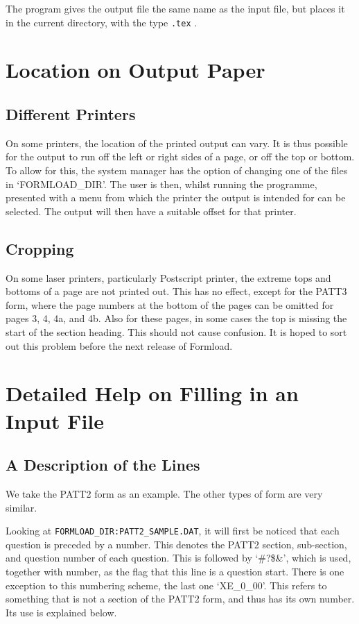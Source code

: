 The program gives the output file the same name as the input file,
but places it in the current directory, with the type {\tt .tex} .

\section{Location on Output Paper}
\label{se:locate}

\subsection{Different Printers} 

On some printers, the location of the printed output can vary. It is thus
possible for the output to run off the left or right sides of a page, or
off the top or bottom. To allow for this, the system manager has the option
of changing one of the files in `FORMLOAD\_DIR'. The user is then, whilst
running the programme, presented with a menu from which the printer the
output is intended for can be selected. The output will then have a
suitable offset for that printer. 


\subsection{Cropping}

On some laser printers, particularly Postscript printer, the extreme tops
and bottoms of a page are not printed out. This has no effect, except for
the PATT3 form, where the page numbers at the bottom of the pages can be
omitted for pages 3, 4, 4a, and 4b. Also for these pages, in some cases the
top is missing the start of the section heading. This should not cause
confusion. It is hoped to sort out this problem before the next release of
Formload. 

\section{Detailed Help on Filling in an Input File}
\label{se:details}

\subsection{A Description of the Lines}

We take the PATT2 form as an example. The other types of form are very
similar. 

Looking at {\tt FORMLOAD\_DIR:PATT2\_SAMPLE.DAT}, it will first be noticed
that each question is preceded by a number. This denotes the PATT2 section,
sub-section, and question number of each question. This is followed by
`\#?\$\&', which is used, together with number, as the flag that this line
is a question start. There is one exception to this numbering scheme, the
last one `XE\_0\_00'. This refers to something that is not a section of the
PATT2 form, and thus has its own number. Its use is explained below. 


